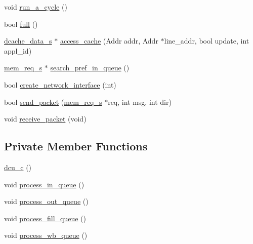 \begin{DoxyCompactItemize}
\item 
void \hyperlink{classdcu__c_a6b4f08e9c538e6d63d0caedecaffdcda}{run\_\-a\_\-cycle} ()
\item 
bool \hyperlink{classdcu__c_aac851f1517b7b10b051491f0ffd09583}{full} ()
\item 
\hyperlink{structdcache__data__s}{dcache\_\-data\_\-s} $\ast$ \hyperlink{classdcu__c_ab04abe7be5561b8cebe2fc5b2b10f677}{access\_\-cache} (Addr addr, Addr $\ast$line\_\-addr, bool update, int appl\_\-id)
\item 
\hyperlink{structmem__req__s}{mem\_\-req\_\-s} $\ast$ \hyperlink{classdcu__c_a44516ada2cdb4e168c71f6b9246e1840}{search\_\-pref\_\-in\_\-queue} ()
\item 
bool \hyperlink{classdcu__c_a64968883497a2f232b3871f7bc05e47e}{create\_\-network\_\-interface} (int)
\item 
bool \hyperlink{classdcu__c_a83778a75013d7c55e929dd86b22e3b25}{send\_\-packet} (\hyperlink{structmem__req__s}{mem\_\-req\_\-s} $\ast$req, int msg, int dir)
\item 
void \hyperlink{classdcu__c_a4ff24d1ebc0e3df58b08d7b8e52af056}{receive\_\-packet} (void)
\end{DoxyCompactItemize}
\subsection*{Private Member Functions}
\begin{DoxyCompactItemize}
\item 
\hyperlink{classdcu__c_ac8bb3b669d6c20b2381f15c7140d4b74}{dcu\_\-c} ()
\item 
void \hyperlink{classdcu__c_a3d18097504fe31cac03406978dd31477}{process\_\-in\_\-queue} ()
\item 
void \hyperlink{classdcu__c_aa34cd13e6faa65115f77d4d01da83096}{process\_\-out\_\-queue} ()
\item 
void \hyperlink{classdcu__c_a8cb64339c417ee62d46298216986e4b5}{process\_\-fill\_\-queue} ()
\item 
void \hyperlink{classdcu__c_aa9c9769a4a8f19bf57365ba1455eb11f}{process\_\-wb\_\-queue} ()
\end{DoxyCompactItemize}
